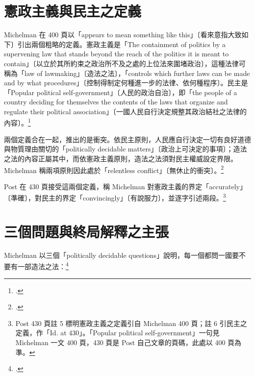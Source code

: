 \section{憲政主義與民主之定義}
\label{sec:10_problem-2}

Michelman 在 400 頁以「appears to mean something like this」〔看來意指大致如下〕引出兩個粗略的定義。憲政主義是「The containment of politics by a supervening law that stands beyond the reach of the politics it is meant to contain」〔以立於其所約束之政治所不及之處的上位法來圍堵政治〕，這種法律可稱為「law of lawmaking」〔造法之法〕，「controls which further laws can be made and by what procedures」〔控制得制定何種進一步的法律、依何種程序〕。民主是「Popular political self-government」〔人民的政治自治〕，即「the people of a country deciding for themselves the contents of the laws that organize and regulate their political association」〔一國人民自行決定規整其政治結社之法律的內容〕。\footcite[400]{michelman1998}

兩個定義合在一起，推出的是衝突。依民主原則，人民應自行決定一切有良好道德與物質理由關切的「politically decidable matters」〔政治上可決定的事項〕；造法之法的內容正屬其中，而依憲政主義原則，造法之法須對民主權威設定界限。Michelman 稱兩項原則因此處於「relentless conflict」〔無休止的衝突〕。\footcite[400]{michelman1998}

Post 在 430 頁接受這兩個定義，稱 Michelman 對憲政主義的界定「accurately」〔準確〕，對民主的界定「convincingly」〔有說服力〕，並逐字引述兩段。\footnote{Post 430 頁註 5 標明憲政主義之定義引自 Michelman 400 頁；註 6 引民主之定義，作「Id. at 430」。「Popular political self-government」一句見 Michelman 一文 400 頁，430 頁是 Post 自己文章的頁碼，此處以 400 頁為準。}

\section{三個問題與終局解釋之主張}
\label{sec:10_problem-3}

Michelman 以三個「politically decidable questions」說明，每一個都問一國要不要有一部造法之法：\footcite[400--401]{michelman1998}


